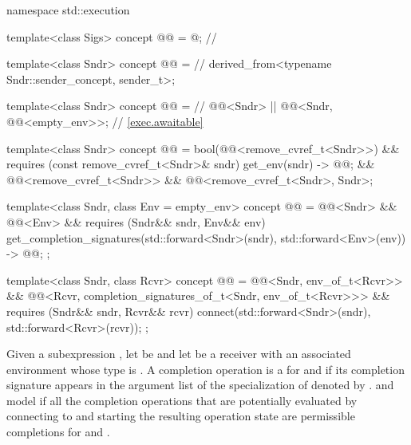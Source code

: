 \begin{codeblock}
namespace std::execution {
  template<class Sigs>
    concept @@ = @\seebelow@;            // \expos

  template<class Sndr>
    concept @@ =                                         // \expos
      derived_from<typename Sndr::sender_concept, sender_t>;

  template<class Sndr>
    concept @@ =                                     // \expos
      @@<Sndr> ||
      @@<Sndr, @@<empty_env>>;               // \ref{exec.awaitable}

  template<class Sndr>
    concept @@ =
      bool(@@<remove_cvref_t<Sndr>>) &&
      requires (const remove_cvref_t<Sndr>& sndr) {
        { get_env(sndr) } -> @@;
      } &&
      @@<remove_cvref_t<Sndr>> &&
      @@<remove_cvref_t<Sndr>, Sndr>;

  template<class Sndr, class Env = empty_env>
    concept @@ =
      @@<Sndr> &&
      @@<Env> &&
      requires (Sndr&& sndr, Env&& env) {
        { get_completion_signatures(std::forward<Sndr>(sndr), std::forward<Env>(env)) }
          -> @@;
      };

  template<class Sndr, class Rcvr>
    concept @@ =
      @@<Sndr, env_of_t<Rcvr>> &&
      @@<Rcvr, completion_signatures_of_t<Sndr, env_of_t<Rcvr>>> &&
      requires (Sndr&& sndr, Rcvr&& rcvr) {
        connect(std::forward<Sndr>(sndr), std::forward<Rcvr>(rcvr));
      };
}
\end{codeblock}

\pnum
Given a subexpression ,
let  be  and
let  be a receiver
with an associated environment whose type is .
A completion operation is a 
for  and 
if its completion signature appears in the argument list of the specialization of  denoted by
.
 and  model 
if all the completion operations
that are potentially evaluated by connecting  to  and
starting the resulting operation state
are permissible completions for  and .

